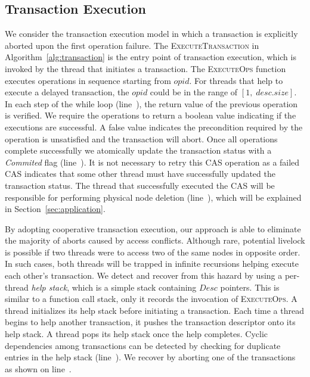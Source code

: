 \documentclass[]{sig-alternate-05-2015}
\begin{document}
\subsection{Transaction Execution}
\label{sec:txnexec}
We consider the transaction execution model in which a transaction is explicitly aborted upon the first operation failure.
The \textsc{ExecuteTransaction} in Algorithm~\ref{alg:transaction} is the entry point of transaction execution, which is invoked by the thread that initiates a transaction.
The \textsc{ExecuteOps} function executes operations in sequence starting from $opid$.
For threads that help to execute a delayed transaction, the $opid$ could be in the range of $[1,\;desc.size]$.
In each step of the while loop (line~), the return value of the previous operation is verified.
We require the operations to return a boolean value indicating if the executions are successful.
A false value indicates the precondition required by the operation is unsatisfied and the transaction will abort. 
Once all operations complete successfully we atomically update the transaction status with a \emph{Commited} flag (line~).
It is not necessary to retry this CAS operation as a failed CAS indicates that some other thread must have successfully updated the transaction status.
The thread that successfully executed the CAS will be responsible for performing physical node deletion (line~), which will be explained in Section~\ref{sec:application}.

By adopting cooperative transaction execution, our approach is able to eliminate the majority of aborts caused by access conflicts.
Although rare, potential livelock is possible if two threads were to access two of the same nodes in opposite order.
In such cases, both threads will be trapped in infinite recursions helping execute each other's transaction.
We detect and recover from this hazard by using a per-thread \emph{help stack}, which is a simple stack containing $Desc$ pointers. 
This is similar to a function call stack, only it records the invocation of \textsc{ExecuteOps}.
A thread initializes its help stack before initiating a transaction.
Each time a thread begins to help another transaction, it pushes the transaction descriptor onto its help stack.
A thread pops its help stack once the help completes.
Cyclic dependencies among transactions can be detected by checking for duplicate entries in the help stack (line~). 
We recover by aborting one of the transactions as shown on line~.
\end{document}
